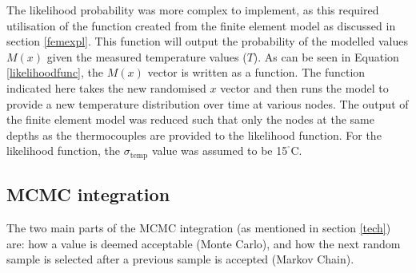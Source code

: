 		The likelihood probability was more complex to implement, as this required utilisation of the function created from the finite element model as discussed in section \ref{femexpl}.
		This function will output the probability of the modelled values $M(x)$ given the measured temperature values ($T$).
		As can be seen in Equation \ref{likelihoodfunc}, the $M(x)$ vector is written as a function.
		The function indicated here takes the new randomised $x$ vector and then runs the model to provide a new temperature distribution over time at various nodes.
		The output of the finite element model was reduced such that only the nodes at the same depths as the thermocouples are provided to the likelihood function.
		For the likelihood function, the $\sigma_{\text{temp}}$ value was assumed to be 15$^{^\circ}$C.
		 

	\subsection{MCMC integration}\label{mcmcexp}
	The two main parts of the MCMC integration (as mentioned in section \ref{tech}) are: how a value is deemed acceptable (Monte Carlo), and how the next random sample is selected after a previous sample is accepted (Markov Chain).
	
